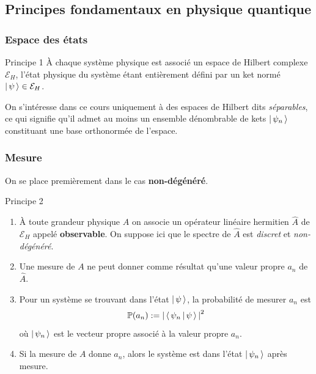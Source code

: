     \subsection{Principes fondamentaux en physique quantique}

        \subsubsection{Espace des états}

\begin{omed}{Principe 1}
    À chaque système physique est associé un espace de Hilbert complexe $\mathcal{E}_H$, l’état physique du système étant entièrement défini par un ket normé $\left| \, \psi \, \right> \in \mathcal{E}_H$.
\end{omed}

    On s’intéresse dans ce cours uniquement à des espaces de Hilbert dits \textit{séparables}, ce qui signifie qu’il admet au moins un ensemble dénombrable de kets $\left| \, \psi_n \, \right>$ constituant une base orthonormée de l’espace.  

        \subsubsection{Mesure}

On se place premièrement dans le cas \textbf{non-dégénéré}.

\begin{omed}{Principe 2}
    \begin{enumerate}[label=($p_{\arabic*}$)]
        \item À toute grandeur physique $A$ on associe un opérateur linéaire hermitien $\hat{A}$ de $\mathcal{E}_H$ appelé \textbf{observable}. On suppose ici que le spectre de $\hat{A}$ est \textit{discret} et \textit{non-dégénéré}.
        \item Une mesure de $A$ ne peut donner comme résultat qu’une valeur propre $a_n$ de $\hat{A}$.
        \item Pour un système se trouvant dans l’état $\left| \, \psi \, \right>$, la probabilité de mesurer $a_n$ est
              \[ \mathbb{P}(a_n) := \left\lvert \, \left< \, \psi_n \, \middle| \, \psi \, \right> \, \right\rvert^2 \]
              où $\left| \, \psi_n \, \right>$ est le vecteur propre associé à la valeur propre $a_n$.
        \item Si la mesure de $A$ donne $a_n$, alors le système est dans l’état $\left| \, \psi_n \, \right>$ après mesure.
    \end{enumerate}
\end{omed}

